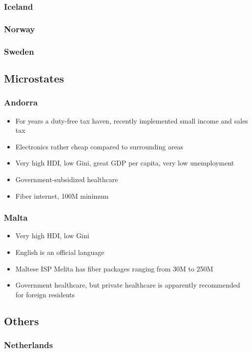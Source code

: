 \documentclass[12pt]{article}
\begin{document}
\subsubsection{Iceland}

\subsubsection{Norway}

\subsubsection{Sweden}



\subsection{Microstates}


\subsubsection{Andorra}

\begin{itemize}
\item For years a duty-free tax haven, recently implemented small income and sales tax
\item Electronics rather cheap compared to surrounding areas
\item Very high HDI, low Gini, great GDP per capita, very low unemployment
\item Government-subsidized healthcare
\item Fiber internet, 100M minimum
\end{itemize}



\subsubsection{Malta}

\begin{itemize}
\item Very high HDI, low Gini
\item English is an official language
\item Maltese ISP Melita has fiber packages ranging from 30M to 250M
\item Government healthcare, but private healthcare is apparently recommended for foreign residents
\end{itemize}

\subsection{Others}


\subsubsection{Netherlands}
\end{document}
